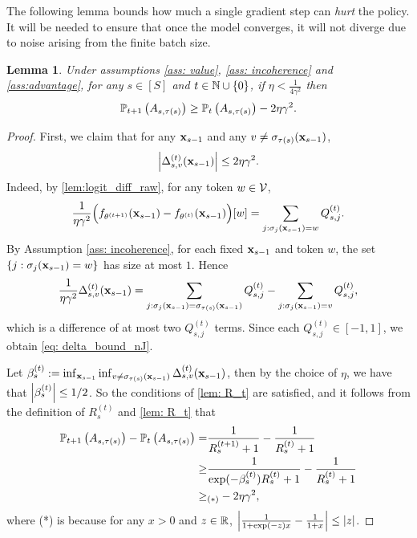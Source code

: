\documentclass{article}
\theoremstyle{plain}
\newtheorem{lemma}[theorem]{Lemma}
\theoremstyle{definition}
\theoremstyle{remark}
\begin{document}
The following lemma bounds how much a single gradient step can \emph{hurt} the policy. It will be needed to ensure that once the model converges, it will not diverge due to noise arising from the finite batch size. 
\begin{lemma}\label{lem: lipscthiz}
    Under assumptions \ref{ass: value}, \ref{ass: incoherence} and \cref{ass:advantage}, for any $s\in[S]$ and $t\in\N\cup\{0\}$, if $\eta < \frac{1}{4\gamma^2}$
    then
    \begin{align*}
        \P_{t+1}\left(A_{s, \tau(s)} \right) \geq \P_t\left(A_{s, \tau(s)} \right) - 2\eta \gamma^2.
    \end{align*}
\end{lemma}
\begin{proof}
    First, we claim that for any $\bx_{s-1}$ and any $v\neq \sigma_{\tau(s)}(\bx_{s-1})$,
    \begin{align}\label{eq: delta_bound_nJ}
        \abs{\Delta^{(t)}_{s, v}(\bx_{s-1})} \leq 2 \eta \gamma^2.
    \end{align}
    Indeed, by \cref{lem:logit_diff_raw}, for any token $w\in \Vcal$,
    \begin{align*}
        \frac{1}{\eta \gamma^2}\Bigl(f_{\theta^{(t+1)}}(\bx_{s-1})-f_{\theta^{(t)}}(\bx_{s-1})\Bigr)[w]
        = \sum_{j:\sigma_j(\bx_{s-1})=w} Q^{(t)}_{s,j}.
    \end{align*}
    By Assumption \ref{ass: incoherence}, for each fixed $\bx_{s-1}$ and token $w$, the set $\{j:\sigma_j(\bx_{s-1})=w\}$ has size at most $1$. Hence
    \begin{align*}
        \frac{1}{\eta \gamma^2}\Delta^{(t)}_{s,v}(\bx_{s-1})
        = \sum_{j:\sigma_j(\bx_{s-1})=\sigma_{\tau(s)}(\bx_{s-1})} Q^{(t)}_{s,j}
        - \sum_{j:\sigma_j(\bx_{s-1})=v} Q^{(t)}_{s,j},
    \end{align*}
    which is a difference of at most two $Q^{(t)}_{s,j}$ terms. Since each $Q^{(t)}_{s,j}\in[-1,1]$, we obtain \eqref{eq: delta_bound_nJ}.

    Let $\beta^{(t)}_{s} := \inf_{\bx_{s-1}} \inf_{v\neq \sigma_{\tau(s)}(\bx_{s-1})} \Delta^{(t)}_{s, v}(\bx_{s-1})$, then by the choice of $\eta$, we have that $\abs{\beta^{(t)}_{s}} \leq 1/2$. So the conditions of \cref{lem: R_t} are satisfied, and it follows from the definition of $R_s^{(t)}$ and \cref{lem: R_t} that 
    \begin{align*}
        \P_{t+1}\left(A_{s, \tau(s)} \right) - \P_t\left(A_{s, \tau(s)} \right) 
        = &\frac{1}{R_s^{(t+1)} + 1} - \frac{1}{R_s^{(t)} + 1} \\ 
        \geq & \frac{1}{\exp(-\beta^{(t)}_s)R_s^{(t)} + 1} - \frac{1}{R_s^{(t)} + 1} \\
        \geq&_{(*)} -2\eta \gamma^2,
    \end{align*}
    where (*) is because for any $x>0$ and $z\in\R$, $\abs{\frac{1}{1+\exp(-z)x} - \frac{1}{1+x}} \leq |z|$.
\end{proof}
\end{document}

